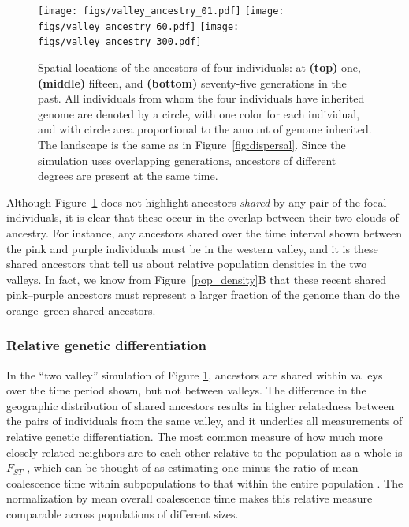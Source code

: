 \documentclass{ar-1col}
\renewcommand{\emph}[1]{{\textit{#1}}}
\begin{document}
\begin{figure}	%
        \texttt{[image: figs/valley\_ancestry\_01.pdf]}
        \texttt{[image: figs/valley\_ancestry\_60.pdf]}
        \texttt{[image: figs/valley\_ancestry\_300.pdf]}
        \caption{
            Spatial locations of the ancestors of four individuals:
            at 
            \textbf{(top)} one, 
            \textbf{(middle)} fifteen, and
            \textbf{(bottom)} seventy-five generations in the past.
            All individuals from whom the four individuals have inherited genome are denoted by a circle,
            with one color for each individual,
            and with circle area proportional to the amount of genome inherited.
            The landscape is the same as in Figure~\ref{fig:dispersal}.
            Since the simulation uses overlapping generations,
            ancestors of different degrees are present at the same time.
        }
        \label{ancestry_spread}
\end{figure}

Although Figure~\ref{ancestry_spread} does not highlight 
ancestors \emph{shared} by any pair of the focal individuals,
it is clear that these occur in the overlap between their two clouds of ancestry.
For instance, any ancestors shared over the time interval shown
between the pink and purple individuals
must be in the western valley,
and it is these shared ancestors that tell us about relative population densities in the two valleys.
In fact, we know from Figure~\ref{pop_density}B that these recent shared pink--purple ancestors
must represent a larger fraction of the genome
than do the orange--green shared ancestors.


\subsubsection{Relative genetic differentiation}

In the ``two valley'' simulation of Figure \ref{ancestry_spread},
ancestors are shared within valleys over the time period shown,
but not between valleys.
The difference in the geographic distribution of shared ancestors 
results in higher relatedness between the pairs of individuals 
from the same valley, 
and it underlies all measurements of relative genetic differentiation.
The most common measure of
how much more closely related neighbors are to each other relative to the population as a whole
is $F_{ST}$ \citep{Wright1951},
which can be thought of as estimating
one minus the ratio of mean coalescence time within subpopulations
to that within the entire population \citep{slatkin_1991inbreeding}.
The normalization by mean overall coalescence time 
makes this relative measure comparable across populations of different sizes.
\end{document}
